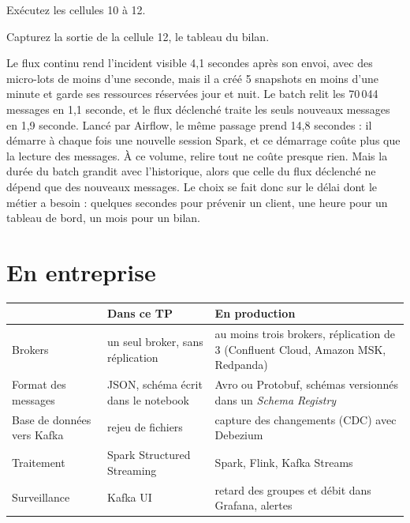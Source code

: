 \begin{obtenir}
  \item Exécutez les cellules 10 à 12.
  \item Capturez la sortie de la cellule 12, le tableau du bilan.
\end{obtenir}
\begin{lecture}
Le flux continu rend l'incident visible 4,1 secondes après son envoi, avec des micro-lots de moins
d'une seconde, mais il a créé 5 snapshots en moins d'une minute et garde ses ressources réservées
jour et nuit. Le batch relit les 70\,044 messages en 1,1 seconde, et le flux déclenché traite les
seuls nouveaux messages en 1,9 seconde. Lancé par Airflow, le même passage prend 14,8 secondes : il
démarre à chaque fois une nouvelle session Spark, et ce démarrage coûte plus que la lecture des
messages. À ce volume, relire tout ne coûte presque rien. Mais la durée du
batch grandit avec l'historique, alors que celle du flux déclenché ne dépend que des nouveaux
messages. Le choix se fait donc sur le délai dont le métier a besoin : quelques secondes pour
prévenir un client, une heure pour un tableau de bord, un mois pour un bilan.
\end{lecture}


\section{En entreprise}

\begin{center}
\small
\renewcommand{\arraystretch}{1.25}
\begin{tabularx}{\textwidth}{@{}l X X@{}}
\toprule
& \textbf{Dans ce TP} & \textbf{En production} \\
\midrule
Brokers & un seul broker, sans réplication & au moins trois brokers, réplication de 3 (Confluent Cloud, Amazon MSK, Redpanda) \\
Format des messages & JSON, schéma écrit dans le notebook & Avro ou Protobuf, schémas versionnés dans un \emph{Schema Registry} \\
Base de données vers Kafka & rejeu de fichiers & capture des changements (CDC) avec Debezium \\
Traitement & Spark Structured Streaming & Spark, Flink, Kafka Streams \\
Surveillance & Kafka UI & retard des groupes et débit dans Grafana, alertes \\
\bottomrule
\end{tabularx}
\end{center}

